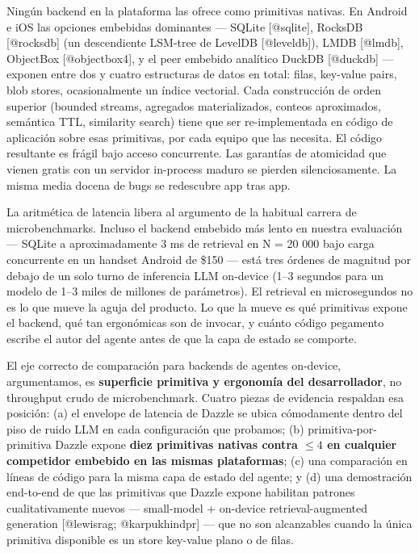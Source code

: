Ningún backend en la plataforma las ofrece como primitivas nativas. En Android e
iOS las opciones embebidas dominantes --- SQLite {[}@sqlite{]}, RocksDB
{[}@rocksdb{]} (un descendiente LSM-tree de LevelDB {[}@leveldb{]}), LMDB
{[}@lmdb{]}, ObjectBox {[}@objectbox4{]}, y el peer embebido analítico DuckDB
{[}@duckdb{]} --- exponen entre dos y cuatro estructuras de datos en total:
filas, key-value pairs, blob stores, ocasionalmente un índice vectorial. Cada
construcción de orden superior (bounded streams, agregados materializados,
conteos aproximados, semántica TTL, similarity search) tiene que ser
re-implementada en código de aplicación sobre esas primitivas, por cada equipo
que las necesita. El código resultante es frágil bajo acceso concurrente. Las
garantías de atomicidad que vienen gratis con un servidor in-process maduro se
pierden silenciosamente. La misma media docena de bugs se redescubre app tras
app.

La aritmética de latencia libera al argumento de la habitual carrera de
microbenchmarks. Incluso el backend embebido más lento en nuestra evaluación ---
SQLite a aproximadamente 3 ms de retrieval en N = 20 000 bajo carga concurrente
en un handset Android de \$150 --- está tres órdenes de magnitud por debajo de
un solo turno de inferencia LLM on-device (1--3 segundos para un modelo de 1--3
miles de millones de parámetros). El retrieval en microsegundos no es lo que
mueve la aguja del producto. Lo que la mueve es qué primitivas expone el
backend, qué tan ergonómicas son de invocar, y cuánto código pegamento escribe
el autor del agente antes de que la capa de estado se comporte.

El eje correcto de comparación para backends de agentes on-device, argumentamos,
es \textbf{superficie primitiva y ergonomía del desarrollador}, no throughput
crudo de microbenchmark. Cuatro piezas de evidencia respaldan esa posición: (a)
el envelope de latencia de Dazzle se ubica cómodamente dentro del piso de ruido
LLM en cada configuración que probamos; (b) primitiva-por-primitiva Dazzle
expone \textbf{diez primitivas nativas contra \(\leq 4\) en cualquier competidor
embebido en las mismas plataformas}; (c) una comparación en líneas de código
para la misma capa de estado del agente; y (d) una demostración end-to-end de
que las primitivas que Dazzle expone habilitan patrones cualitativamente nuevos
--- small-model + on-device retrieval-augmented generation {[}@lewisrag;
@karpukhindpr{]} --- que no son alcanzables cuando la única primitiva disponible
es un store key-value plano o de filas.

